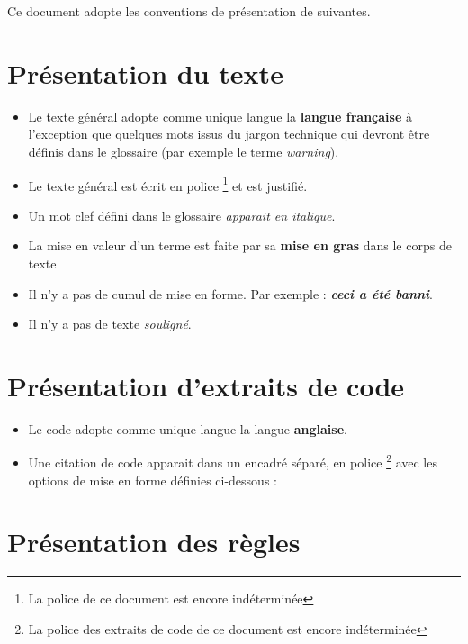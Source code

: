 Ce document adopte les conventions de présentation de suivantes. \medskip

\section{Présentation du texte}

\begin{itemize}
\item Le texte général adopte comme unique langue la \textbf{langue française} à l’exception que quelques mots issus du jargon technique qui devront être définis dans le glossaire (par exemple le terme \textit{warning}).
\item Le texte général est écrit en police \footnote{La police de ce document est encore indéterminée} et est justifié.
\item Un mot clef défini dans le glossaire \textit{apparait en italique}.
\item La mise en valeur d’un terme est faite par sa \textbf{mise en gras} dans le corps de texte
\item Il n’y a pas de cumul de mise en forme. Par exemple : \textbf{\textit{ceci a été banni}}.
\item Il n’y a pas de texte \textsl{souligné}.
\end{itemize}
\bigskip

\section{Présentation d'extraits de code}

\begin{itemize}
\item Le code adopte comme unique langue la langue \textbf{anglaise}.
\item Une citation de code apparait dans un encadré séparé, en police \footnote{La police des extraits de code de ce document est encore indéterminée} avec les options de mise en forme définies ci-dessous :
\end{itemize}


% 

\pagebreak

\section{Présentation des règles}


